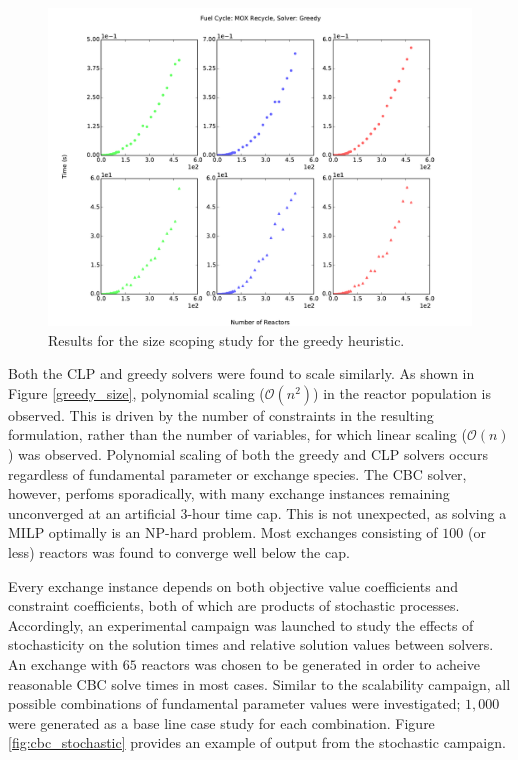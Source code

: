 \documentclass{anstrans}
\begin{document}
\begin{figure}
  \begin{center}
    \includegraphics[width=1.5\columnwidth]{base_back_n_rxtr_time_fc1_solvergreedy.pdf}
    \caption[]{
      \label{fig:greedy_size}
      Results for the size scoping study for the greedy heuristic.
      }
  \end{center}
\end{figure}

Both the CLP and greedy solvers were found to scale similarly. As shown in
Figure \ref{greedy_size}, polynomial scaling ($\mathcal{O}(n^2)$) in the reactor
population is observed. This is driven by the number of constraints in the
resulting formulation, rather than the number of variables, for which linear
scaling ($\mathcal{O}(n)$) was observed. Polynomial scaling of both the greedy
and CLP solvers occurs regardless of fundamental parameter or exchange
species. The CBC solver, however, perfoms sporadically, with many exchange
instances remaining unconverged at an artificial $3$-hour time cap. This is not
unexpected, as solving a MILP optimally is an NP-hard problem. Most exchanges
consisting of $100$ (or less) reactors was found to converge well below the cap.

Every exchange instance depends on both objective value coefficients and
constraint coefficients, both of which are products of stochastic
processes. Accordingly, an experimental campaign was launched to study the
effects of stochasticity on the solution times and relative solution values
between solvers. An exchange with $65$ reactors was chosen to be generated in
order to acheive reasonable CBC solve times in most cases. Similar to the
scalability campaign, all possible combinations of fundamental parameter values
were investigated; $1,000$ were generated as a base line case study for each
combination. Figure \ref{fig:cbc_stochastic} provides an example of output from
the stochastic campaign.
\end{document}
